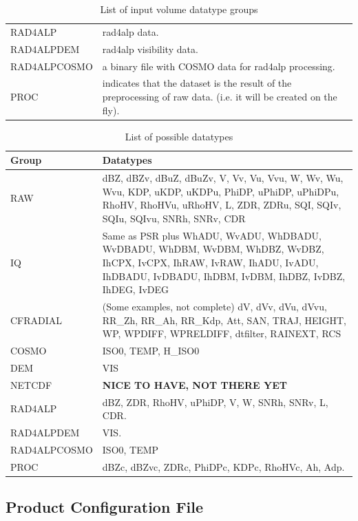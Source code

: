 \documentclass[a4paper,11pt,pdftex,twoside]{scrartcl}
\renewcommand{\bf}{\normalfont \bfseries}
\begin{document}
{{{\begin{table}[H]
\begin{tabularx}{\textwidth}{lX}
RAD4ALP & rad4alp data.\\
RAD4ALPDEM & rad4alp visibility data.\\
RAD4ALPCOSMO & a binary file with COSMO data for rad4alp processing.\\
PROC & indicates that the dataset is the result of the preprocessing of raw data. (i.e. it will be created on the fly).\\

\end{tabularx}
\caption{List of input volume datatype groups}
\label{tab_datatype_groups}
\end{table}


\begin{table}[H]
\begin{tabularx}{\textwidth}{lX}
\bf{Group} & \bf{Datatypes}\\
\hline
RAW      & dBZ, dBZv, dBuZ, dBuZv, V, Vv, Vu, Vvu, W, Wv, Wu, Wvu,
            KDP, uKDP, uKDPu, PhiDP, uPhiDP, uPhiDPu, RhoHV,
            RhoHVu, uRhoHV, L, ZDR, ZDRu, SQI, SQIv, SQIu, SQIvu, SNRh, SNRv, CDR\\
IQ        & Same as PSR plus WhADU, WvADU, WhDBADU, WvDBADU, WhDBM, WvDBM, WhDBZ, WvDBZ, IhCPX, IvCPX, IhRAW, IvRAW, IhADU, IvADU, IhDBADU, IvDBADU, IhDBM, IvDBM, IhDBZ, IvDBZ, IhDEG, IvDEG\\
CFRADIAL     & (Some examples, not complete) dV, dVv, dVu, dVvu, RR\_Zh, RR\_Ah,
            RR\_Kdp, Att, SAN, TRAJ, HEIGHT, WP, WPDIFF, WPRELDIFF,
            dtfilter, RAINEXT, RCS\\
COSMO     & ISO0, TEMP, H\_ISO0\\
DEM         & VIS\\
NETCDF    & {\bf NICE TO HAVE, NOT THERE YET} \\
RAD4ALP & dBZ, ZDR, RhoHV, uPhiDP, V, W, SNRh, SNRv, L, CDR.\\
RAD4ALPDEM & VIS.\\
RAD4ALPCOSMO & ISO0, TEMP\\
PROC & dBZc, dBZvc, ZDRc, PhiDPc, KDPc, RhoHVc, Ah, Adp.\\
\end{tabularx}
\caption{List of possible datatypes}
\label{tab_datatypes}
\end{table}


\subsection{Product Configuration File}

}}}
\end{document}
